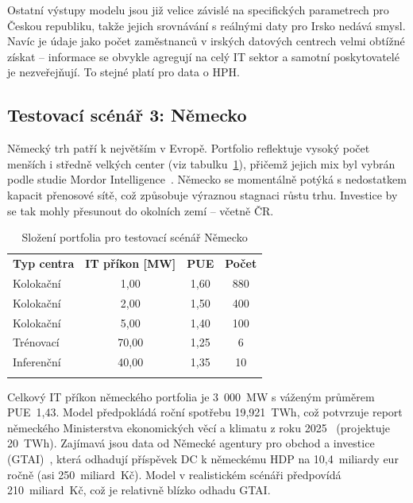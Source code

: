 Ostatní výstupy modelu jsou již velice závislé na specifických parametrech pro Českou republiku, takže jejich srovnávání s reálnými daty pro Irsko nedává smysl. Navíc je údaje jako počet zaměstnanců v irských datových centrech velmi obtížné získat -- informace se obvykle agregují na celý IT sektor a samotní poskytovatelé je nezveřejňují. To stejné platí pro data o HPH.

\subsection{Testovací scénář 3: Německo}
\label{subsec:testovani_nemecko}

Německý trh patří k největším v Evropě. Portfolio reflektuje vysoký počet menších i středně velkých center (viz tabulku~\ref{tab:portfolio_nemecko}), přičemž jejich mix byl vybrán podle studie Mordor Intelligence~\cite{mordor_intelligence_germany_2026}. Německo se momentálně potýká s nedostatkem kapacit přenosové sítě, což způsobuje výraznou stagnaci růstu trhu. Investice by se tak mohly přesunout do okolních zemí -- včetně ČR.

\begin{table}[t]
    \centering
    \setlength{\tabcolsep}{6pt}

    \caption{Složení portfolia pro testovací scénář Německo}
    \label{tab:portfolio_nemecko}

    \begin{tabular}{p{4cm}ccc}
        \toprule
        \addlinespace

        \textbf{Typ centra} & \textbf{IT příkon [MW]} & \textbf{PUE} & \textbf{Počet} \\

        \addlinespace
        \midrule
        \addlinespace

        Kolokační & 1,00 & 1,60 & 880 \\
        Kolokační & 2,00 & 1,50 & 400 \\
        Kolokační & 5,00 & 1,40 & 100 \\
        Trénovací & 70,00 & 1,25 & 6 \\
        Inferenční & 40,00 & 1,35 & 10 \\

        \addlinespace
        \bottomrule
    \end{tabular}
\end{table}

Celkový IT příkon německého portfolia je 3~000~MW s váženým průměrem PUE~1,43. Model předpokládá roční spotřebu 19,921~TWh, což potvrzuje report německého Ministerstva ekonomických věcí a klimatu z roku 2025~\cite{testing_berlin_2025} (projektuje 20~TWh). Zajímavá jsou data od Německé agentury pro obchod a investice (GTAI)~\cite{gtai_landscape_2025}, která odhadují příspěvek DC k německému HDP na 10,4~miliardy eur ročně (asi 250~miliard~Kč). Model v realistickém scénáři předpovídá 210~miliard~Kč, což je relativně blízko odhadu GTAI.

